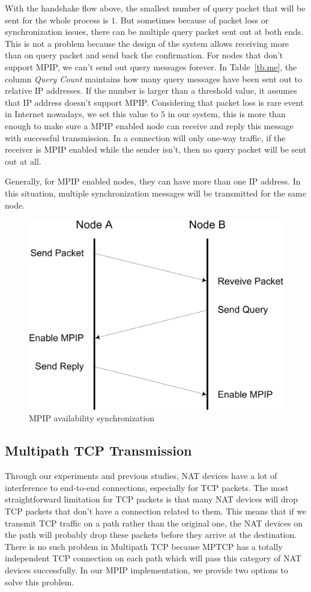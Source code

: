 With the handshake flow above, the smallest number of query packet that will be sent for the whole process is $1$. But sometimes because of packet loss or synchronization issues, there can be multiple query packet sent out at both ends. This is not a problem because the design of the system allows receiving more than on query packet and send back the confirmation. For nodes that don\textquoteright t support MPIP, we can\textquoteright t send out query messages forever. In Table~\ref{tb.me}, the column \emph{Query Count} maintains how many query messages have been sent out to relative IP addresses. If the number is larger than a threshold value, it assumes that IP address doesn\textquoteright t support MPIP. Considering that packet loss is rare event in Internet nowadays, we set this value to $5$ in our system, this is more than enough to make sure a MPIP enabled node can receive and reply this message with successful transmission. In a connection will only one-way traffic, if the receiver is MPIP enabled while the sender isn't, then no query packet will be sent out at all.

Generally, for MPIP enabled nodes, they can have more than one IP address. In this situation, multiple synchronization messages will be transmitted for the same node.

\begin{figure}
\centering
\includegraphics[width=0.8\linewidth]{fig/me.eps}
\caption{MPIP availability synchronization}
\label{fig.me}
\end{figure}

\subsection{Multipath TCP Transmission}
Through our experiments and previous studies\cite{mptcp}, NAT devices have a lot of interference to end-to-end connections, especially for TCP packets. The most straightforward limitation for TCP packets is that many NAT devices will drop TCP packets that don't have a connection related to them. This means that if we transmit TCP traffic on a path rather than the original one, the NAT devices on the path will probably drop these packets before they arrive at the destination. There is no such problem in Multipath TCP\cite{mptcp} because MPTCP has a totally independent TCP connection on each path which will pass this category of NAT devices successfully. In our MPIP implementation, we provide two options to solve this problem.

